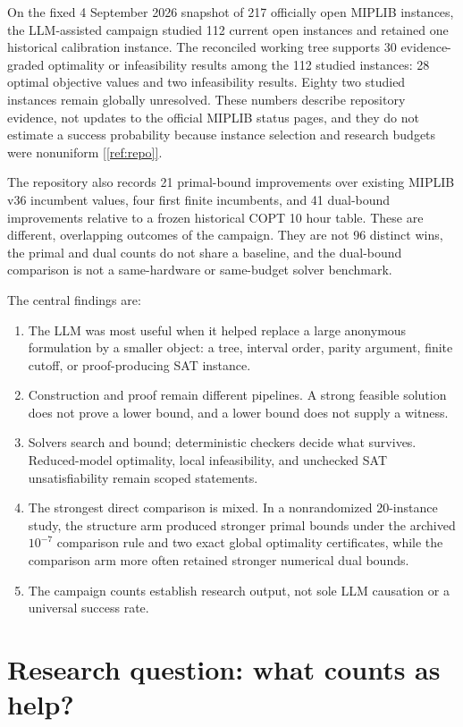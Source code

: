 \documentclass[11pt,letterpaper]{article}
\newcommand{\sourcecite}[1]{\hyperref[#1]{[\ref*{#1}]}}
\begin{document}
On the fixed 4 September 2026 snapshot of 217 officially open MIPLIB instances, the LLM-assisted campaign studied 112 current open instances and retained one historical calibration instance. The reconciled working tree supports 30 evidence-graded optimality or infeasibility results among the 112 studied instances: 28 optimal objective values and two infeasibility results. Eighty two studied instances remain globally unresolved. These numbers describe repository evidence, not updates to the official MIPLIB status pages, and they do not estimate a success probability because instance selection and research budgets were nonuniform \sourcecite{ref:repo}.

The repository also records 21 primal-bound improvements over existing MIPLIB v36 incumbent values, four first finite incumbents, and 41 dual-bound improvements relative to a frozen historical COPT 10 hour table. These are different, overlapping outcomes of the campaign. They are not 96 distinct wins, the primal and dual counts do not share a baseline, and the dual-bound comparison is not a same-hardware or same-budget solver benchmark.

The central findings are:

\begin{enumerate}
\item The LLM was most useful when it helped replace a large anonymous formulation by a smaller object: a tree, interval order, parity argument, finite cutoff, or proof-producing SAT instance.
\item Construction and proof remain different pipelines. A strong feasible solution does not prove a lower bound, and a lower bound does not supply a witness.
\item Solvers search and bound; deterministic checkers decide what survives. Reduced-model optimality, local infeasibility, and unchecked SAT unsatisfiability remain scoped statements.
\item The strongest direct comparison is mixed. In a nonrandomized 20-instance study, the structure arm produced stronger primal bounds under the archived $10^{-7}$ comparison rule and two exact global optimality certificates, while the comparison arm more often retained stronger numerical dual bounds.
\item The campaign counts establish research output, not sole LLM causation or a universal success rate.
\end{enumerate}

\section{Research question: what counts as help?}
\end{document}
